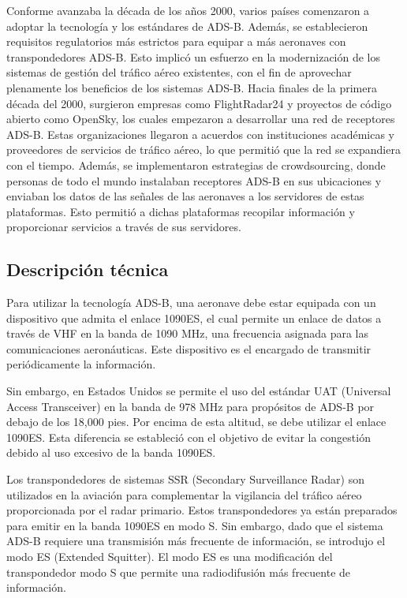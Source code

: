 \documentclass[a4paper, 11pt]{book}
\begin{document}
Conforme avanzaba la década de los años 2000, varios países comenzaron a adoptar la tecnología y los estándares de ADS-B. Además, se establecieron requisitos regulatorios más estrictos para equipar a más aeronaves con transpondedores ADS-B. Esto implicó un esfuerzo en la modernización de los sistemas de gestión del tráfico aéreo existentes, con el fin de aprovechar plenamente los beneficios de los sistemas ADS-B.
Hacia finales de la primera década del 2000, surgieron empresas como FlightRadar24 y proyectos de código abierto como OpenSky, los cuales empezaron a desarrollar una red de receptores ADS-B. Estas organizaciones llegaron a acuerdos con instituciones académicas y proveedores de servicios de tráfico aéreo, lo que permitió que la red se expandiera con el tiempo. Además, se implementaron estrategias de crowdsourcing, donde personas de todo el mundo instalaban receptores ADS-B en sus ubicaciones y enviaban los datos de las señales de las aeronaves a los servidores de estas plataformas. Esto permitió a dichas plataformas recopilar información y proporcionar servicios a través de sus servidores.
\subsection{Descripción técnica}
Para utilizar la tecnología ADS-B, una aeronave debe estar equipada con un dispositivo que admita el enlace 1090ES, el cual permite un enlace de datos a través de VHF en la banda de 1090 MHz, una frecuencia asignada para las comunicaciones aeronáuticas. Este dispositivo es el encargado de transmitir periódicamente la información.

Sin embargo, en Estados Unidos se permite el uso del estándar UAT (Universal Access Transceiver) en la banda de 978 MHz para propósitos de ADS-B por debajo de los 18,000 pies. Por encima de esta altitud, se debe utilizar el enlace 1090ES. Esta diferencia se estableció con el objetivo de evitar la congestión debido al uso excesivo de la banda 1090ES.

Los transpondedores de sistemas SSR (Secondary Surveillance Radar) son utilizados en la aviación para complementar la vigilancia del tráfico aéreo proporcionada por el radar primario. Estos transpondedores ya están preparados para emitir en la banda 1090ES en modo S. Sin embargo, dado que el sistema ADS-B requiere una transmisión más frecuente de información, se introdujo el modo ES (Extended Squitter). El modo ES es una modificación del transpondedor modo S que permite una radiodifusión más frecuente de información.
\end{document}
